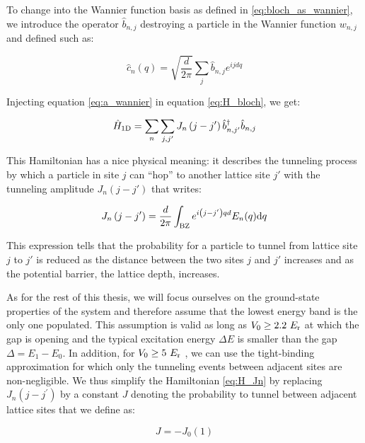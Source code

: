 \noindent To change into the Wannier function basis as defined in \ref{eq:bloch_as_wannier}, we introduce the operator $\hat{b}_{n,j}$ destroying a particle in the Wannier function $w_{n,j}$ and defined such as:

\begin{equation}
    \hat{c}_{n}(q)=\sqrt{\frac{d}{2 \pi}} \sum_{j} \hat{b}_{n, j} e^{i j d q}
    \label{eq:a_wannier}
\end{equation}

\noindent Injecting equation \ref{eq:a_wannier} in equation \ref{eq:H_bloch}, we get:

\begin{equation}
    \hat{H}_{\rm{1D}}=\sum_{n} \sum_{j, j^{\prime}} J_{n}\left(j-j^{\prime}\right) \hat{b}_{n, j^{\prime}}^{\dagger} \hat{b}_{n,j}
    \label{eq:H_Jn}
\end{equation}

\noindent This Hamiltonian has a nice physical meaning: it describes the tunneling process by which a particle in site $j$ can ``hop'' to another lattice site $j'$ with the tunneling amplitude $J_n (j-j')$ that writes:

\begin{equation}
    J_{n}\left(j-j^{\prime}\right)=\frac{d}{2 \pi} \int_{\rm{BZ}} e^{i\left(j-j^{\prime}\right) q d} E_{n}(q) \mathrm{d} q
\end{equation}

\noindent This expression tells that the probability for a particle to tunnel from lattice site $j$ to $j'$ is reduced as the distance between the two sites $j$ and $j'$ increases and as the potential barrier, \ie the lattice depth, increases.

As for the rest of this thesis, we will focus ourselves on the ground-state properties of the system and therefore assume that the lowest energy band is the only one populated. This assumption is valid as long as $V_0 \geq 2.2 \ E_{\rm{r}}$ at which the gap is opening and the typical excitation energy $\Delta E$ is smaller than the gap $\Delta=E_1-E_0$. In addition, for $V_0 \geq 5 \ E_{\rm{r}}$ \cite{gerbier_notes}, we can use the tight-binding approximation for which only the tunneling events between adjacent sites are non-negligible. We thus simplify the Hamiltonian \ref{eq:H_Jn} by replacing  $J_{n}\left(j-j^{\prime}\right)$ by a constant $J$ denoting the probability to tunnel between adjacent lattice sites that we define as:

\begin{equation}
    J=-J_0(1)
\end{equation}

